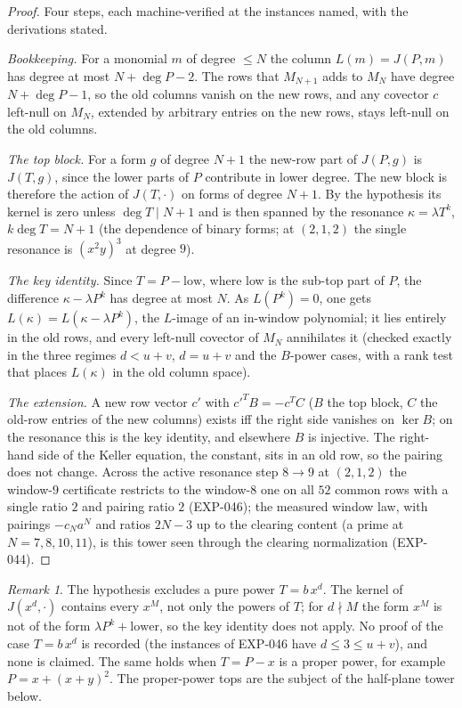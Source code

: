 \documentclass[11pt]{article}
\theoremstyle{remark}
\newtheorem{remark}[theorem]{Remark}
\begin{document}
\begin{proof}
Four steps, each machine-verified at the instances named, with the derivations stated.

\emph{Bookkeeping.} For a monomial $m$ of degree $\le N$ the column $L(m)=J(P,m)$ has degree at most $N+\deg P-2$.
The rows that $M_{N+1}$ adds to $M_N$ have degree $N+\deg P-1$, so the old columns vanish on the new rows, and
any covector $c$ left-null on $M_N$, extended by arbitrary entries on the new rows, stays left-null on the old columns.

\emph{The top block.} For a form $g$ of degree $N+1$ the new-row part of $J(P,g)$ is $J(T,g)$, since the lower parts of
$P$ contribute in lower degree. The new block is therefore the action of $J(T,\cdot)$ on forms of degree $N+1$. By the
hypothesis its kernel is zero unless $\deg T\mid N+1$ and is then spanned by the resonance $\kappa=\lambda T^{k}$,
$k\deg T=N+1$ (the dependence of binary forms; at $(2,1,2)$ the single resonance is $(x^2y)^3$ at degree $9$).

\emph{The key identity.} Since $T=P-\text{low}$, where low is the sub-top part of $P$, the difference
$\kappa-\lambda P^{k}$ has degree at most $N$. As $L(P^k)=0$, one gets $L(\kappa)=L(\kappa-\lambda P^k)$, the
$L$-image of an in-window polynomial; it lies entirely in the old rows, and every left-null covector of $M_N$
annihilates it (checked exactly in the three regimes $d<u+v$, $d=u+v$ and the $B$-power cases, with a rank test that
places $L(\kappa)$ in the old column space).

\emph{The extension.} A new row vector $c'$ with $c'^TB=-c^TC$ ($B$ the top block, $C$ the old-row entries of the new
columns) exists iff the right side vanishes on $\ker B$; on the resonance this is the key identity, and elsewhere $B$ is
injective. The right-hand side of the Keller equation, the constant, sits in an old row, so the pairing does not change.
Across the active resonance step $8\to9$ at $(2,1,2)$ the window-$9$ certificate restricts to the window-$8$ one on all $52$
common rows with a single ratio $2$ and pairing ratio $2$ (EXP-046); the measured window law, with pairings $-c_Na^N$ and
ratios $2N-3$ up to the clearing content (a prime at $N=7,8,10,11$), is this tower seen through the clearing normalization (EXP-044).
\end{proof}

\begin{remark}
The hypothesis excludes a pure power $T=b\,x^d$. The kernel of $J(x^d,\cdot)$ contains every $x^M$, not only the powers of
$T$; for $d\nmid M$ the form $x^M$ is not of the form $\lambda P^k+\text{lower}$, so the key identity does not apply.
No proof of the case $T=b\,x^d$ is recorded (the instances of EXP-046 have $d\le3\le u+v$), and none is claimed. The same
holds when $T=P-x$ is a proper power, for example $P=x+(x+y)^2$. The proper-power tops are the subject of the half-plane
tower below.
\end{remark}
\end{document}
